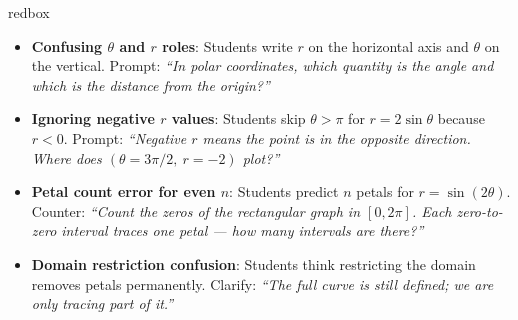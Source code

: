 \documentclass[10pt]{article}
\begin{document}
\vspace{0.08in}

\begin{skillbox}{redbox}
\begin{itemize}[leftmargin=1.4em, itemsep=3pt]
  \item \textbf{Confusing $\theta$ and $r$ roles}: Students write $r$ on the horizontal
    axis and $\theta$ on the vertical. Prompt: \textit{``In polar coordinates, which
    quantity is the angle and which is the distance from the origin?''}
  \item \textbf{Ignoring negative $r$ values}: Students skip $\theta > \pi$ for
    $r = 2\sin\theta$ because $r < 0$. Prompt: \textit{``Negative $r$ means the
    point is in the opposite direction. Where does $(\theta = 3\pi/2,\ r = -2)$ plot?''}
  \item \textbf{Petal count error for even $n$}: Students predict $n$ petals for
    $r = \sin(2\theta)$. Counter: \textit{``Count the zeros of the rectangular graph
    in $[0, 2\pi]$. Each zero-to-zero interval traces one petal --- how many intervals
    are there?''}
  \item \textbf{Domain restriction confusion}: Students think restricting the domain
    removes petals permanently. Clarify: \textit{``The full curve is still defined;
    we are only tracing part of it.''}
\end{itemize}
\end{skillbox}

\vspace{0.08in}
\end{document}
